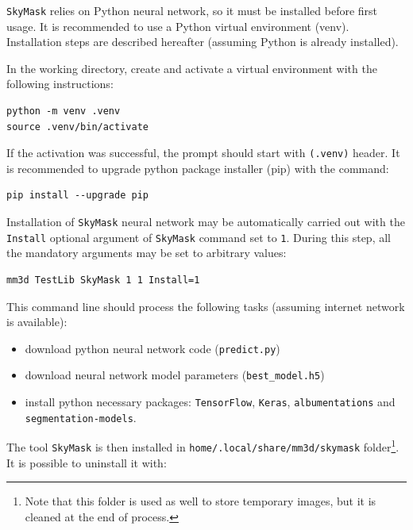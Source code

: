 \noindent \texttt{SkyMask} relies on Python neural network, so it must be installed before first usage. It is recommended to use a Python virtual environment (venv). Installation steps are described hereafter (assuming Python is already installed). \newline

\noindent In the working directory, create and activate a virtual environment with the following instructions: \newline

\begin{verbatim}
python -m venv .venv
source .venv/bin/activate 
\end{verbatim}

\noindent If the activation was successful, the prompt should start with \texttt{(.venv)} header. It is recommended to upgrade python package installer (pip) with the command: \newline

\begin{verbatim}
pip install --upgrade pip
\end{verbatim}

\noindent Installation of \texttt{SkyMask} neural network may be automatically carried out with the \texttt{Install} optional argument of \texttt{SkyMask} command set to \texttt{1}. During this step, all the mandatory arguments may be set to arbitrary values: \newline

\begin{verbatim}
mm3d TestLib SkyMask 1 1 Install=1
\end{verbatim}

\noindent This command line should process the following tasks (assuming internet network is available): \newline


\begin{itemize}
	\item download python neural network code (\texttt{predict.py})
	\item download neural network model parameters (\texttt{best\_model.h5})
	\item install python necessary packages:  \texttt{TensorFlow}, \texttt{Keras}, \texttt{albumentations} and \texttt{segmentation-models}. \newline
\end{itemize}

\noindent The tool \texttt{SkyMask} is then installed in \texttt{home/.local/share/mm3d/skymask} folder\footnote{Note that this folder is used as well to store temporary images, but it is cleaned at the end of process.}. It is possible to uninstall it with: \newline

